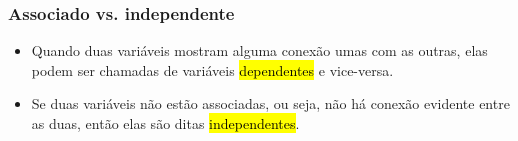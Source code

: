 
\begin{frame}
\frametitle{Associado vs. independente}

\begin{itemize}
\justifying
\item Quando duas variáveis mostram alguma conexão umas com as outras, elas podem ser chamadas de variáveis \hl{dependentes} e vice-versa.

\justifying
\item Se duas variáveis não estão associadas, ou seja, não há conexão evidente entre as duas, então elas são ditas \hl{independentes}.

\end{itemize}

\end{frame}

